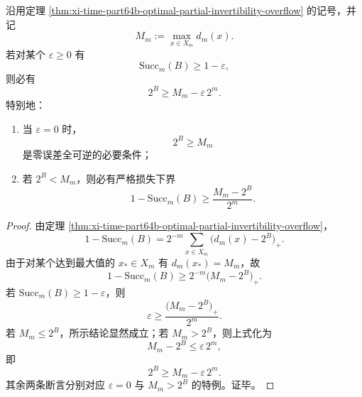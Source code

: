 \begin{corollary}[近完美读出的尖锐必要条件]\label{cor:xi-time-part64b-near-perfect-readout-sharp-necessary-condition}
沿用定理 \ref{thm:xi-time-part64b-optimal-partial-invertibility-overflow} 的记号，并记
\[
M_m:=\max_{x\in X_m}d_m(x).
\]
若对某个 \(\varepsilon\ge 0\) 有
\[
\mathrm{Succ}_m(B)\ge 1-\varepsilon,
\]
则必有
\[
\boxed{\;
2^B\ge M_m-\varepsilon\,2^m.\;}
\]
特别地：
\begin{enumerate}
  \item 当 \(\varepsilon=0\) 时，
  \[
  2^B\ge M_m
  \]
  是零误差全可逆的必要条件；
  \item 若 \(2^B<M_m\)，则必有严格损失下界
  \[
  \boxed{\;
  1-\mathrm{Succ}_m(B)\ge \frac{M_m-2^B}{2^m}.\;}
  \]
\end{enumerate}
\end{corollary}
\begin{proof}
由定理 \ref{thm:xi-time-part64b-optimal-partial-invertibility-overflow}，
\[
1-\mathrm{Succ}_m(B)
=
2^{-m}\sum_{x\in X_m}\bigl(d_m(x)-2^B\bigr)_+.
\]
由于对某个达到最大值的 \(x_\ast\in X_m\) 有 \(d_m(x_\ast)=M_m\)，故
\[
1-\mathrm{Succ}_m(B)
\ge
2^{-m}\bigl(M_m-2^B\bigr)_+.
\]
若 \(\mathrm{Succ}_m(B)\ge 1-\varepsilon\)，则
\[
\varepsilon\ge \frac{\bigl(M_m-2^B\bigr)_+}{2^m}.
\]
若 \(M_m\le 2^B\)，所示结论显然成立；若 \(M_m>2^B\)，则上式化为
\[
M_m-2^B\le \varepsilon\,2^m,
\]
即
\[
2^B\ge M_m-\varepsilon\,2^m.
\]
其余两条断言分别对应 \(\varepsilon=0\) 与 \(M_m>2^B\) 的特例。证毕。
\end{proof}


